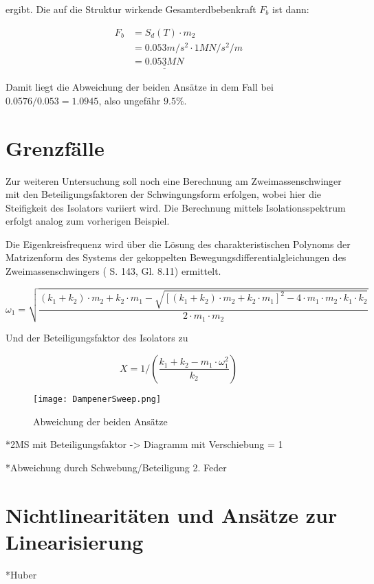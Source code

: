 ergibt. Die auf die Struktur wirkende Gesamterdbebenkraft $F_b$ ist dann:

\begin{align*}
F_b &= S_d(T) \cdot m_2\\
    &= 0.053 m/s^2 \cdot 1 MN/s^2/m\\
    &= \underline{\underline{0.053 MN}}
\end{align*}

Damit liegt die Abweichung der beiden Ansätze in dem Fall bei $0.0576/0.053=1.0945$, also ungefähr $9.5\%$.

\pagebreak

\section{Grenzfälle}
\label{sec:grenzfalle}

Zur weiteren Untersuchung soll noch eine Berechnung am Zweimassenschwinger mit den Beteiligungsfaktoren der Schwingungsform erfolgen, wobei hier die Steifigkeit des Isolators variiert wird. Die Berechnung mittels Isolationsspektrum erfolgt analog zum vorherigen Beispiel.

Die Eigenkreisfrequenz wird über die Lösung des charakteristischen Polynoms der Matrizenform des Systems der gekoppelten Bewegungsdifferentialgleichungen des Zweimassenschwingers (\cite{Pocanschi} S. 143, Gl. 8.11) ermittelt.

\begin{equation*}
\omega_1 = \sqrt{\frac{(k_1 + k_2) \cdot m_2 + k_2 \cdot m_1 - \sqrt{[(k_1 + k_2) \cdot m_2 + k_2 \cdot  m_1]^2 - 4 \cdot m_1 \cdot m_2 \cdot k_1 \cdot k_2}}{2 \cdot m_1 \cdot m_2}}
\end{equation*}

Und der Beteiligungsfaktor des Isolators zu

\begin{equation*}
X = 1/\left( \frac{k_1 + k_2 - m_1 \cdot \omega_1^2}{k_2} \right)
\end{equation*}

\begin{figure}[ht] 
    \centering
    \texttt{[image: DampenerSweep.png]}
    \caption{Abweichung der beiden Ansätze}
    \label{fig:Bemessungsspektrum}
\end{figure}

*2MS mit Beteiligungsfaktor  -> Diagramm mit Verschiebung = 1

*Abweichung durch Schwebung/Beteiligung 2. Feder 

\pagebreak

\section{Nichtlinearitäten und Ansätze zur Linearisierung}
\label{sec:nichtlinearitaten}

*Huber

\pagebreak